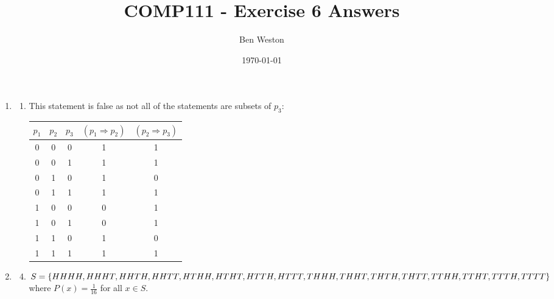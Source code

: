 \documentclass{article}
\title{COMP111 - Exercise 6 Answers}
\author{Ben Weston}
\date{\today}
\begin{document}
\maketitle
\begin{enumerate}
        \item
                \begin{enumerate}
                        \item This statement is false as not all of the statements are subsets of $p_3$:
                                \begin{table}[H]
                                        \centering
                                        \begin{tabular}{|c|c|c|c|c|}
                                                \hline
                                                $p_1$ & $p_2$ & $p_3$ & $(p_1\Rightarrow p_2)$ & $(p_2\Rightarrow p_3)$\\
                                                \hline\hline
                                                0 & 0 & 0 & 1 & 1\\
                                                \hline
                                                0 & 0 & 1 & 1 & 1\\
                                                \hline
                                                0 & 1 & 0 & 1 & 0\\
                                                \hline
                                                0 & 1 & 1 & 1 & 1\\
                                                \hline
                                                1 & 0 & 0 & 0 & 1\\
                                                \hline
                                                1 & 0 & 1 & 0 & 1\\
                                                \hline
                                                1 & 1 & 0 & 1 & 0\\
                                                \hline
                                                1 & 1 & 1 & 1 & 1\\
                                                \hline
                                        \end{tabular}
                                \end{table}
                \end{enumerate}
                \setcounter{enumi}{2}
        \item
                \begin{enumerate}\setcounter{enumii}{3}
                        \item $S=\{HHHH,HHHT,HHTH,HHTT,HTHH,HTHT,HTTH,\\HTTT,THHH,THHT,THTH,THTT,TTHH,TTHT,TTTH,\\TTTT\}$ where $P(x)=\frac{1}{16}$ for all $x\in S$.


\end{enumerate}
\end{enumerate}
\end{document}
